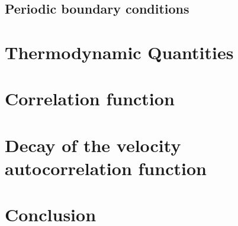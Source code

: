 \documentclass[aps,prl,reprint,groupedaddress]{revtex4-1}
\begin{document}
\subsection{Periodic boundary conditions}

\section{Thermodynamic Quantities \label{thermo}}

\section{Correlation function \label{correlation}}

\section{Decay of the velocity autocorrelation function \label{decay}}

\section{Conclusion \label{conclusion}}



\end{document}
